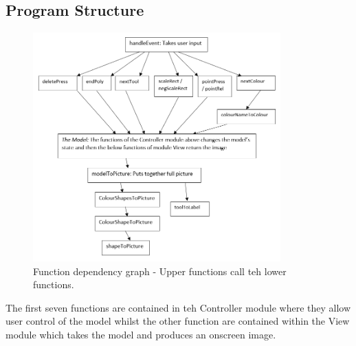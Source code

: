 \documentclass[11pt]{article}
\begin{document}
\subsection{Program Structure}
\begin{figure}[H]
\centering
\includegraphics[width=0.85\textwidth]{program.png}
\caption{Function dependency graph - Upper functions call teh lower functions.}
\end{figure}
The first seven functions are contained in teh Controller module where they allow user control of the model whilst the other function are contained within the View module which takes the model and produces an onscreen image.
\end{document}
